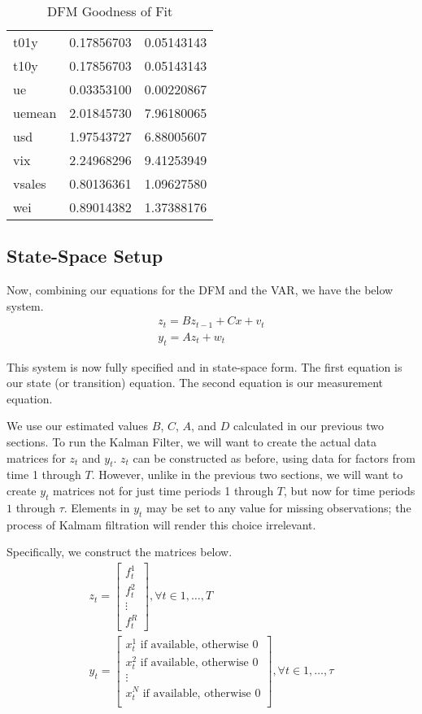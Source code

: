 \documentclass[11pt, letterpaper]{article}\usepackage[]{graphicx}\usepackage[]{color}
\begin{document}
\begin{table}[H]
\begin{tabular}{lrr}
  t01y & 0.17856703 & 0.05143143 \\ 
  t10y & 0.17856703 & 0.05143143 \\ 
  ue & 0.03353100 & 0.00220867 \\ 
  uemean & 2.01845730 & 7.96180065 \\ 
  usd & 1.97543727 & 6.88005607 \\ 
  vix & 2.24968296 & 9.41253949 \\ 
  vsales & 0.80136361 & 1.09627580 \\ 
  wei & 0.89014382 & 1.37388176 \\ 
   \hline
\end{tabular}
\endgroup
\caption{DFM Goodness of Fit} 
\end{table}





\subsection{State-Space Setup}
Now, combining our equations for the DFM and the VAR, we have the below system.
\begin{align*}
z_t = B z_{t-1} + Cx + v_t\\
y_t = A z_t + w_t
\end{align*}

This system is now fully specified and in state-space form. The first equation is our state (or transition) equation. The second equation is our measurement equation. 

We use our estimated values $B$, $C$, $A$, and $D$ calculated in our previous two sections. To run the Kalman Filter, we will want to create the actual data matrices for $z_t$ and $y_t$. $z_t$ can be constructed as before, using data for factors from time 1 through $T$. However, unlike in the previous two sections, we will want to create $y_t$ matrices not for just time periods 1 through $T$, but now for time periods $1$ through $\tau$. Elements in $y_t$ may be set to any value for missing observations; the process of Kalmam filtration will render this choice irrelevant.

Specifically, we construct the matrices below.
\begin{align*}
z_t
=
\begin{bmatrix}
	f^1_{t}\\
	f^2_{t}\\
	\vdots \\
	f^R_{t}
\end{bmatrix}, \forall t \in 1, \dots, T\\
y_t
=
\begin{bmatrix}
	\text{$x^1_{t}$ if available, otherwise 0}\\
	\text{$x^2_{t}$ if available, otherwise 0}\\
	\vdots \\
	\text{$x^N_{t}$ if available, otherwise 0}\\
\end{bmatrix}, \forall t \in 1, \dots, \tau
\end{align*}
\end{document}

